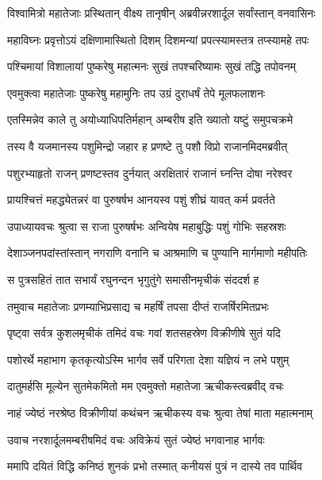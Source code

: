 
\twolineshloka
{विश्वामित्रो महातेजाः प्रस्थितान् वीक्ष्य तानृषीन्}
{अब्रवीन्नरशार्दूल सर्वांस्तान् वनवासिनः} %

\twolineshloka
{महाविघ्नः प्रवृत्तोऽयं दक्षिणामास्थितो दिशम्}
{दिशमन्यां प्रपत्स्यामस्तत्र तप्स्यामहे तपः} %

\twolineshloka
{पश्चिमायां विशालायां पुष्करेषु महात्मनः}
{सुखं तपश्चरिष्यामः सुखं तद्धि तपोवनम्} %

\twolineshloka
{एवमुक्त्वा महातेजाः पुष्करेषु महामुनिः}
{तप उग्रं दुराधर्षं तेपे मूलफलाशनः} %

\twolineshloka
{एतस्मिन्नेव काले तु अयोध्याधिपतिर्महान्}
{अम्बरीष इति ख्यातो यष्टुं समुपचक्रमे} %

\twolineshloka
{तस्य वै यजमानस्य पशुमिन्द्रो जहार ह}
{प्रणष्टे तु पशौ विप्रो राजानमिदमब्रवीत्} %

\twolineshloka
{पशुरभ्याहृतो राजन् प्रणष्टस्तव दुर्नयात्}
{अरक्षितारं राजानं घ्नन्ति दोषा नरेश्वर} %

\twolineshloka
{प्रायश्चित्तं महद्ध्येतन्नरं वा पुरुषर्षभ}
{आनयस्व पशुं शीघ्रं यावत् कर्म प्रवर्तते} %

\twolineshloka
{उपाध्यायवचः श्रुत्वा स राजा पुरुषर्षभः}
{अन्वियेष महाबुद्धिः पशुं गोभिः सहस्रशः} %

\twolineshloka
{देशाञ्जनपदांस्तांस्तान् नगराणि वनानि च}
{आश्रमाणि च पुण्यानि मार्गमाणो महीपतिः} %

\twolineshloka
{स पुत्रसहितं तात सभार्यं रघुनन्दन}
{भृगुतुंगे समासीनमृचीकं संददर्श ह} %

\twolineshloka
{तमुवाच महातेजाः प्रणम्याभिप्रसाद्य च}
{महर्षिं तपसा दीप्तं राजर्षिरमितप्रभः} %

\twolineshloka
{पृष्ट्वा सर्वत्र कुशलमृचीकं तमिदं वचः}
{गवां शतसहस्रेण विक्रीणीषे सुतं यदि} %

\twolineshloka
{पशोरर्थे महाभाग कृतकृत्योऽस्मि भार्गव}
{सर्वे परिगता देशा यज्ञियं न लभे पशुम्} %

\twolineshloka
{दातुमर्हसि मूल्येन सुतमेकमितो मम}
{एवमुक्तो महातेजा ऋचीकस्त्वब्रवीद् वचः} %

\twolineshloka
{नाहं ज्येष्ठं नरश्रेष्ठ विक्रीणीयां कथंचन}
{ऋचीकस्य वचः श्रुत्वा तेषां माता महात्मनाम्} %

\twolineshloka
{उवाच नरशार्दूलमम्बरीषमिदं वचः}
{अविक्रेयं सुतं ज्येष्ठं भगवानाह भार्गवः} %

\twolineshloka
{ममापि दयितं विद्धि कनिष्ठं शुनकं प्रभो}
{तस्मात् कनीयसं पुत्रं न दास्ये तव पार्थिव} %

